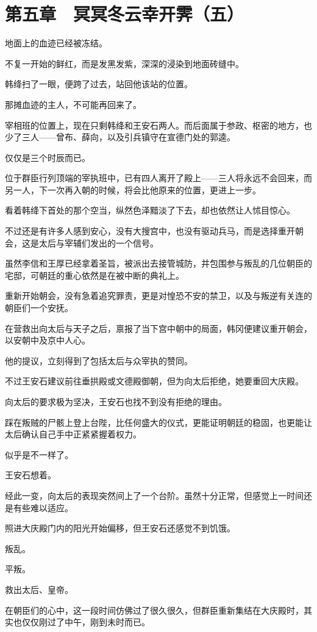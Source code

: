 \section{第五章　冥冥冬云幸开霁（五）}

地面上的血迹已经被冻结。

不复一开始的鲜红，而是发黑发紫，深深的浸染到地面砖缝中。

韩绛扫了一眼，便跨了过去，站回他该站的位置。

那摊血迹的主人，不可能再回来了。

宰相班的位置上，现在只剩韩绛和王安石两人。而后面属于参政、枢密的地方，也少了三人——曾布、薛向，以及引兵镇守在宣德门处的郭逵。

仅仅是三个时辰而已。

位于群臣行列顶端的宰执班中，已有四人离开了殿上——三人将永远不会回来，而另一人，下一次再入朝的时候，将会比他原来的位置，更进上一步。

看着韩绛下首处的那个空当，纵然色泽黯淡了下去，却也依然让人怵目惊心。

不过还是有许多人感到安心，没有大搜宫中，也没有驱动兵马，而是选择重开朝会，这是太后与宰辅们发出的一个信号。

虽然李信和王厚已经拿着圣旨，被派出去接管城防，并包围参与叛乱的几位朝臣的宅邸，可朝廷的重心依然是在被中断的典礼上。

重新开始朝会，没有急着追究罪责，更是对惶恐不安的禁卫，以及与叛逆有关连的朝臣们一个安抚。

在营救出向太后与天子之后，禀报了当下宫中朝中的局面，韩冈便建议重开朝会，以安朝中及京中人心。

他的提议，立刻得到了包括太后与众宰执的赞同。

不过王安石建议前往垂拱殿或文德殿御朝，但为向太后拒绝，她要重回大庆殿。

向太后的要求极为坚决，王安石也找不到没有拒绝的理由。

踩在叛贼的尸骸上登上台陛，比任何盛大的仪式，更能证明朝廷的稳固，也更能让太后确认自己手中正紧紧握着权力。

似乎是不一样了。

王安石想着。

经此一变，向太后的表现突然间上了一个台阶。虽然十分正常，但感觉上一时间还是有些难以适应。

照进大庆殿门内的阳光开始偏移，但王安石还感觉不到饥饿。

叛乱。

平叛。

救出太后、皇帝。

在朝臣们的心中，这一段时间仿佛过了很久很久，但群臣重新集结在大庆殿时，其实也仅仅刚过了中午，刚到未时而已。

